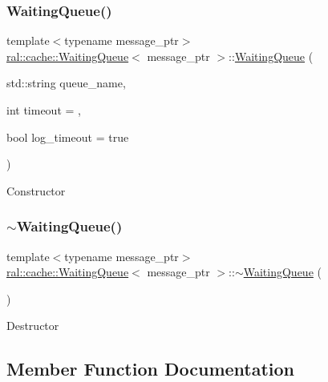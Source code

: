 \subsubsection{\texorpdfstring{Waiting\+Queue()}{WaitingQueue()}}
{\footnotesize\ttfamily template$<$typename message\+\_\+ptr$>$ \\
\hyperlink{classral_1_1cache_1_1WaitingQueue}{ral\+::cache\+::\+Waiting\+Queue}$<$ message\+\_\+ptr $>$\+::\hyperlink{classral_1_1cache_1_1WaitingQueue}{Waiting\+Queue} (\begin{DoxyParamCaption}\item[{std\+::string}]{queue\+\_\+name,  }\item[{int}]{timeout = {},  }\item[{bool}]{log\+\_\+timeout = {\ttfamily true} }\end{DoxyParamCaption})\hspace{0.3cm}{\ttfamily [inline]}}

Constructor \mbox{\label{classral_1_1cache_1_1WaitingQueue_a09240aad671d08e2df7fe90b0a3a268b}} 
\subsubsection{\texorpdfstring{$\sim$\+Waiting\+Queue()}{~WaitingQueue()}}
{\footnotesize\ttfamily template$<$typename message\+\_\+ptr$>$ \\
\hyperlink{classral_1_1cache_1_1WaitingQueue}{ral\+::cache\+::\+Waiting\+Queue}$<$ message\+\_\+ptr $>$\+::$\sim$\hyperlink{classral_1_1cache_1_1WaitingQueue}{Waiting\+Queue} (\begin{DoxyParamCaption}{ }\end{DoxyParamCaption})\hspace{0.3cm}{\ttfamily [default]}}

Destructor 

\subsection{Member Function Documentation}
\mbox{\label{classral_1_1cache_1_1WaitingQueue_af489dc4d0c5cb810109beb3e9ff97062}} 
